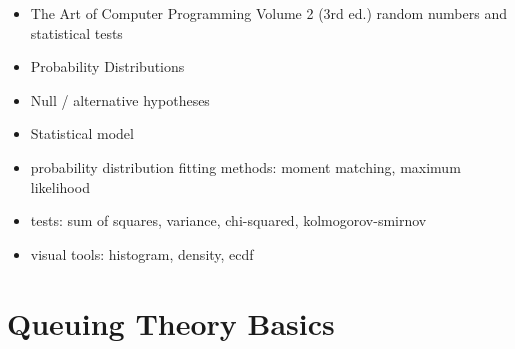 \begin{itemize}
\item The Art of Computer Programming Volume 2 (3rd ed.) random numbers and statistical tests\cite{Knuth:1997:ACP:270146}
\item Probability Distributions
\item Null / alternative hypotheses
\item Statistical model
\item probability distribution fitting
		methods: moment matching, maximum likelihood
\item tests: sum of squares, variance, chi-squared, kolmogorov-smirnov
\item visual tools: histogram, density, ecdf

\end{itemize}



\section{Queuing Theory Basics}



